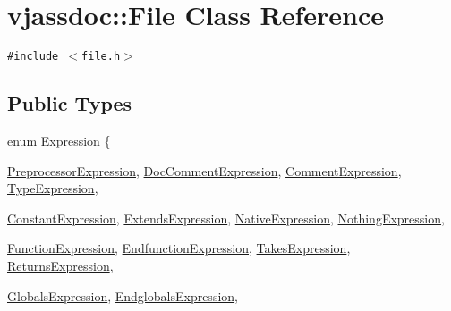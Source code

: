 \hypertarget{classvjassdoc_1_1File}{
\section{vjassdoc::File Class Reference}
\label{classvjassdoc_1_1File}
}
{\tt \#include $<$file.h$>$}

\subsection*{Public Types}
\begin{CompactItemize}
\item 
enum \hyperlink{classvjassdoc_1_1File_78479b8cb631d0db80ba984da1781265}{Expression} \{ \par
\hyperlink{classvjassdoc_1_1File_78479b8cb631d0db80ba984da17812651b865eb7837fa58aa48ea6e0db11aef3}{PreprocessorExpression}, 
\hyperlink{classvjassdoc_1_1File_78479b8cb631d0db80ba984da1781265b4a9c2519ee43d16d4037f75a67cad0a}{DocCommentExpression}, 
\hyperlink{classvjassdoc_1_1File_78479b8cb631d0db80ba984da17812651eb711a77df439eca7d9c35ae6b61fc2}{CommentExpression}, 
\hyperlink{classvjassdoc_1_1File_78479b8cb631d0db80ba984da17812653e8a9b6e963deb6df9c8fe3625b51a8d}{TypeExpression}, 
\par
\hyperlink{classvjassdoc_1_1File_78479b8cb631d0db80ba984da17812654058cc2c8a8c9723fd45766e631d9e0e}{ConstantExpression}, 
\hyperlink{classvjassdoc_1_1File_78479b8cb631d0db80ba984da1781265695caaefe6d8b5a21559bdfeecf8cec8}{ExtendsExpression}, 
\hyperlink{classvjassdoc_1_1File_78479b8cb631d0db80ba984da17812655e40c3e6596bebee34de6c44c9d9bcec}{NativeExpression}, 
\hyperlink{classvjassdoc_1_1File_78479b8cb631d0db80ba984da178126595e0227e32402f65db935d12a7bcb5e4}{NothingExpression}, 
\par
\hyperlink{classvjassdoc_1_1File_78479b8cb631d0db80ba984da1781265cc522891e16a6cc75c211607a6325ebe}{FunctionExpression}, 
\hyperlink{classvjassdoc_1_1File_78479b8cb631d0db80ba984da1781265e98a592745ca3714c40ebf465979eb72}{EndfunctionExpression}, 
\hyperlink{classvjassdoc_1_1File_78479b8cb631d0db80ba984da1781265486a35a903ff1266cd7dc58edfcdedcc}{TakesExpression}, 
\hyperlink{classvjassdoc_1_1File_78479b8cb631d0db80ba984da178126562a370dd1e411e75df2a184517e68816}{ReturnsExpression}, 
\par
\hyperlink{classvjassdoc_1_1File_78479b8cb631d0db80ba984da1781265115a4523bd4b2d6c5ba29ecfe50ac779}{GlobalsExpression}, 
\hyperlink{classvjassdoc_1_1File_78479b8cb631d0db80ba984da1781265800e41973cb47a647ab273fd03c75963}{EndglobalsExpression}, 

\end{CompactItemize}
